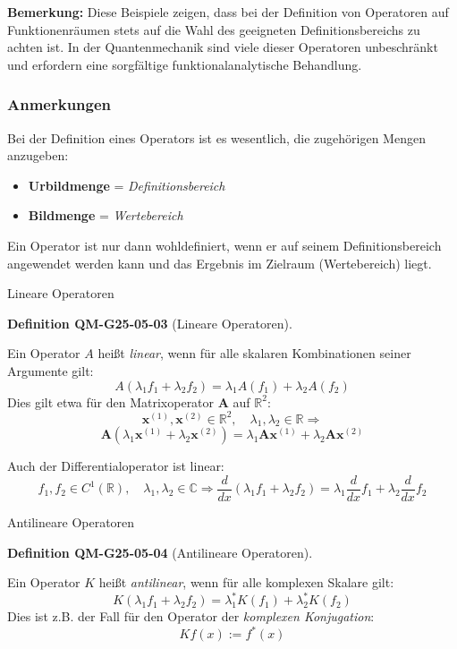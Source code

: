 \documentclass[10pt, letterpaper]{article}
\newcommand{\CustomHeading}[3]{%
  \par\medskip\noindent%
  \textbf{#1 #2} \textnormal{(#3)}.\enskip%
}
\newenvironment{DEF}[2]{\begin{unitbox}\CustomHeading{Definition}{#1}{#2}}{\end{unitbox}}
\begin{document}
\textbf{Bemerkung:} Diese Beispiele zeigen, dass bei der Definition von Operatoren auf Funktionenräumen stets auf die Wahl des geeigneten Definitionsbereichs zu achten ist. In der Quantenmechanik sind viele dieser Operatoren unbeschränkt und erfordern eine sorgfältige funktionalanalytische Behandlung.


\subsubsection*{Anmerkungen}
Bei der Definition eines Operators ist es wesentlich, die zugehörigen Mengen anzugeben:

\begin{itemize}
  \item \textbf{Urbildmenge} = \emph{Definitionsbereich}
  \item \textbf{Bildmenge} = \emph{Wertebereich}
\end{itemize}

Ein Operator ist nur dann wohldefiniert, wenn er auf seinem Definitionsbereich angewendet werden kann und das Ergebnis im Zielraum (Wertebereich) liegt.

\vspace{1em}




Lineare Operatoren

\begin{DEF}{QM-G25-05-03}{Lineare Operatoren}
Ein Operator $A$ heißt \emph{linear}, wenn für alle skalaren Kombinationen seiner Argumente gilt:
\[
A(\lambda_1 f_1 + \lambda_2 f_2) = \lambda_1 A(f_1) + \lambda_2 A(f_2)
\]
Dies gilt etwa für den Matrixoperator $\mathbf{A}$ auf $\mathbb{R}^2$:
\[
\mathbf{x}^{(1)}, \mathbf{x}^{(2)} \in \mathbb{R}^{2}, \quad \lambda_1, \lambda_2 \in \mathbb{R} \Rightarrow
\]
\[
\mathbf{A}(\lambda_1 \mathbf{x}^{(1)} + \lambda_2 \mathbf{x}^{(2)}) = \lambda_1 \mathbf{A} \mathbf{x}^{(1)} + \lambda_2 \mathbf{A} \mathbf{x}^{(2)}
\]

Auch der Differentialoperator ist linear:
\[
f_1, f_2 \in C^1(\mathbb{R}), \quad \lambda_1, \lambda_2 \in \mathbb{C}
\Rightarrow
\frac{d}{dx}(\lambda_1 f_1 + \lambda_2 f_2)
= \lambda_1 \frac{d}{dx} f_1 + \lambda_2 \frac{d}{dx} f_2
\]
\end{DEF}

\vspace{1em}




Antilineare Operatoren


\begin{DEF}{QM-G25-05-04}{Antilineare Operatoren}
Ein Operator $K$ heißt \emph{antilinear}, wenn für alle komplexen Skalare gilt:
\[
K(\lambda_1 f_1 + \lambda_2 f_2) = \lambda_1^* K(f_1) + \lambda_2^* K(f_2)
\]
Dies ist z.B. der Fall für den Operator der \emph{komplexen Konjugation}:
\[
K f(x) := f^*(x)
\]
\end{DEF}
\end{document}
